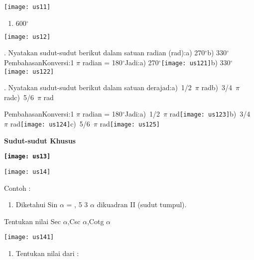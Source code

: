 \documentclass[11pt,fleqn]{book} %
\begin{document}
\begin{myEnumerate}
\begin{itemize}
\noindent \texttt{[image: us11]}

\begin{enumerate}
\item  $600\boldsymbol{{}^\circ }$
\end{enumerate}

\noindent \texttt{[image: us12]}

\noindent 

. Nyatakan sudut-sudut berikut dalam satuan radian (rad):a) 270$\mathrm{{}^\circ}$b) 330$\mathrm{{}^\circ}$PembahasanKonversi:1 $\pi$ radian = 180$\mathrm{{}^\circ}$Jadi:a) 270$\mathrm{{}^\circ}$\texttt{[image: us121]}b) 330${}^\circ$\texttt{[image: us122]}

. Nyatakan sudut-sudut berikut dalam satuan derajad:a)~1/2~$\pi$ radb)~3/4~$\pi$ radc)~5/6~$\pi$ rad

\noindent PembahasanKonversi:1 $\pi$ radian = 180$\mathrm{{}^\circ}$Jadi:a)~1/2~$\pi$ rad\texttt{[image: us123]}b)~3/4~$\pi$ rad\texttt{[image: us124]}c)~5/6~$\pi$ rad\texttt{[image: us125]}

\noindent 

\noindent \textbf{Sudut-sudut Khusus}

\noindent \textbf{\texttt{[image: us13]}}

\noindent \texttt{[image: us14]}\textbf{}

\noindent Contoh : 

\begin{enumerate}
\item  Diketahui Sin $\alpha$ = , 5 3 $\alpha$ dikuadran II (sudut tumpul). 
\end{enumerate}

Tentukan nilai Sec $\alpha$,Csc $\alpha$,Cotg $\alpha$ 

 \texttt{[image: us141]}

\noindent 

\begin{enumerate}
\item   Tentukan nilai dari :
\end{enumerate}


\end{itemize}
\end{myEnumerate}
\end{document}
